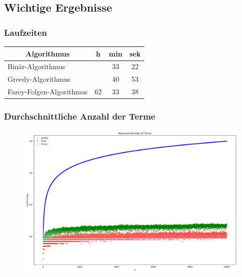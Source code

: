 \documentclass{beamer}
\begin{document}
\subsection[Ergebnisse]{Wichtige Ergebnisse}
\begin{frame}
	\frametitle{Laufzeiten}
	\begin{center}
	\begin{tabular}{|l | c c c|}
		\hline
		\multicolumn{1}{|c|}{\textbf{Algorithmus}} & h & min & sek \\ \hline
		Binär-Algorithmus & & 33 & 22 \\ \hline
		Greedy-Algorithmus & & 40 &  53 \\ \hline
		Farey-Folgen-Algorithmus & 62 & 33 & 38 \\ \hline
	\end{tabular}
	\end{center}
\end{frame}



\begin{frame}
	\frametitle{Durchschnittliche Anzahl der Terme}
	\begin{figure}[h]
		\includegraphics[width=\textwidth]{../LaTeX-Doc/images/maxTerms.png}
	\end{figure}
\end{frame}
\end{document}

